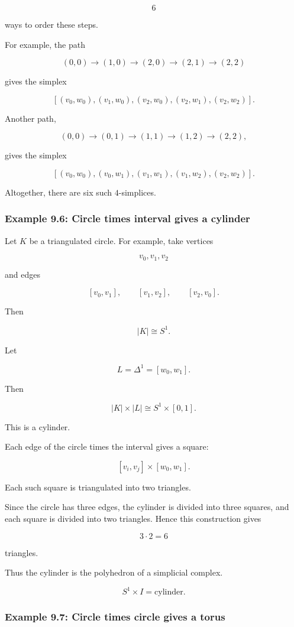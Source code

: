 \documentclass[12pt,a4paper]{article}
\theoremstyle{notespace}
\begin{document}
\[
6
\]

ways to order these steps.

For example, the path

\[
(0,0)\to(1,0)\to(2,0)\to(2,1)\to(2,2)
\]

gives the simplex

\[
[(v_0,w_0),(v_1,w_0),(v_2,w_0),(v_2,w_1),(v_2,w_2)].
\]

Another path,

\[
(0,0)\to(0,1)\to(1,1)\to(1,2)\to(2,2),
\]

gives the simplex

\[
[(v_0,w_0),(v_0,w_1),(v_1,w_1),(v_1,w_2),(v_2,w_2)].
\]

Altogether, there are six such \(4\)-simplices.

\subsubsection{Example 9.6: Circle times interval gives a cylinder}

Let \(K\) be a triangulated circle. For example, take vertices

\[
v_0,v_1,v_2
\]

and edges

\[
[v_0,v_1],
\qquad
[v_1,v_2],
\qquad
[v_2,v_0].
\]

Then

\[
|K|\cong S^1.
\]

Let

\[
L=\Delta^1=[w_0,w_1].
\]

Then

\[
|K|\times |L|
\cong
S^1\times [0,1].
\]

This is a cylinder.

Each edge of the circle times the interval gives a square:

\[
[v_i,v_j]\times [w_0,w_1].
\]

Each such square is triangulated into two triangles.

Since the circle has three edges, the cylinder is divided into three squares, and each square is divided into two triangles. Hence this construction gives

\[
3\cdot 2=6
\]

triangles.

Thus the cylinder is the polyhedron of a simplicial complex.

\[
S^1\times I
=
\text{cylinder}.
\]

\subsubsection{Example 9.7: Circle times circle gives a torus}
\end{document}
